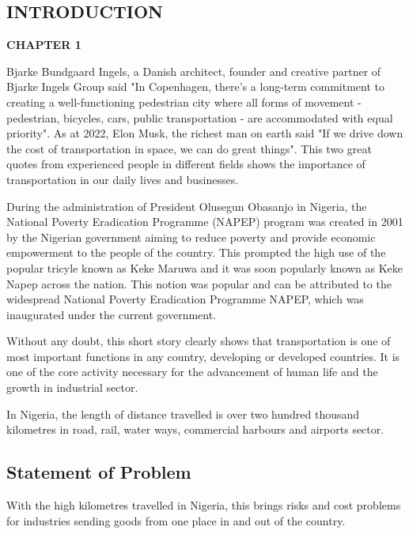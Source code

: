 \documentclass{article}
\begin{document}
\newpage

\begin{center}
\section{INTRODUCTION}
\textbf{CHAPTER 1}
\end{center}
Bjarke Bundgaard Ingels, a Danish architect, founder and creative partner of Bjarke Ingels Group said "In Copenhagen, there's a long-term commitment to creating a well-functioning pedestrian city where all forms of movement - pedestrian, bicycles, cars, public transportation - are accommodated with equal priority". As at 2022, Elon Musk, the richest man on earth said "If we drive down the cost of transportation in space, we can do great things". This two great quotes from experienced people in different fields shows the importance of transportation in our daily lives and businesses.

During the administration of President Olusegun Obasanjo in Nigeria, the National Poverty Eradication Programme (NAPEP) program was created in 2001 by the Nigerian government aiming to reduce poverty and provide economic empowerment to the people of the country. This prompted the high use of the popular tricyle known as Keke Maruwa and it was soon popularly known as Keke Napep across the nation. This notion was popular and can be attributed to the widespread National Poverty Eradication Programme NAPEP, which was inaugurated under the current government.

Without any doubt, this short story clearly shows that transportation is one of most important functions in any country, developing or developed countries. It is one of the core activity necessary for the advancement of human life and the growth in industrial sector.

In Nigeria, the length of distance travelled is over two hundred thousand kilometres in road, rail, water ways, commercial harbours and airports sector.

\newpage

\begin{center}
\subsection{Statement of Problem}
\end{center}
With the high kilometres travelled in Nigeria, this brings risks and cost problems for industries sending goods from one place in and out of the country.
\end{document}
